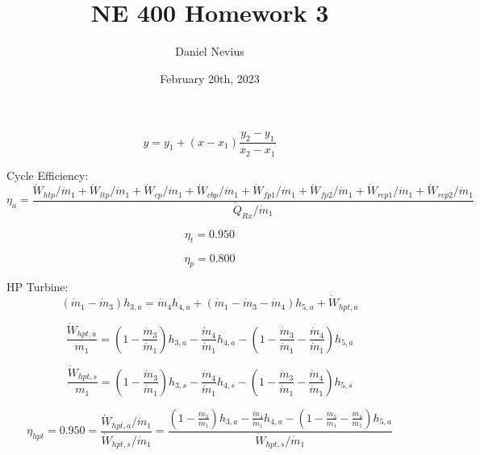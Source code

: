 \documentclass{article}
\title{NE 400 Homework 3}
\author{Daniel Nevius}
\date{February 20th, 2023}
\begin{document}
\maketitle

\section{}

\begin{equation}\label{interpolation}
y = y_1 + (x - x_1) \frac{y_2 - y_1}{x_2 - x_1}
\end{equation}


Cycle Efficiency:
\begin{equation}
\eta_{a} = \frac{\dot{W}_{htp    } / \dot{m}_{1} + \dot{W}_{ltp    } / \dot{m}_{1} + \dot{W}_{cp     } / \dot{m}_{1} + \dot{W}_{cbp    } / \dot{m}_{1} + \dot{W}_{fp1    } / \dot{m}_{1} + \dot{W}_{fp2    } / \dot{m}_{1} + \dot{W}_{rcp1   } / \dot{m}_{1} + \dot{W}_{rcp2   } / \dot{m}_{1}}{\dot{Q}_{Rx     } / \dot{m}_{1}}
\end{equation}

\begin{equation}
\eta_{t} =    0.950
\end{equation}

\begin{equation}
\eta_{p} =    0.800
\end{equation}


HP Turbine:
\begin{equation}
(\dot{m}_{ 1} - \dot{m}_{ 3})h_{ 3,a} = \dot{m}_{ 4}h_{ 4,a} + (\dot{m}_{ 1} - \dot{m}_{ 3} - \dot{m}_{ 4})h_{ 5,a} + \dot{W}_{hpt,a}
\end{equation}

\begin{equation}
\frac{\dot{W}_{hpt,a}}{m_1} = (1 - \frac{\dot{m}_{ 3}}{\dot{m}_{ 1}})h_{ 3,a} - \frac{\dot{m}_{ 4}}{\dot{m}_{ 1}}h_{ 4,a} - (1 - \frac{\dot{m}_{ 3}}{\dot{m}_{ 1}} - \frac{\dot{m}_{ 4}}{\dot{m}_{ 1}})h_{ 5,a}\end{equation}

\begin{equation}\label{hpt_s}
\frac{\dot{W}_{hpt,s}}{m_1} = (1 - \frac{\dot{m}_{ 3}}{\dot{m}_{ 1}})h_{ 3,s} - \frac{\dot{m}_{ 4}}{\dot{m}_{ 1}}h_{ 4,s} - (1 - \frac{\dot{m}_{ 3}}{\dot{m}_{ 1}} - \frac{\dot{m}_{ 4}}{\dot{m}_{ 1}})h_{ 5,s}\end{equation}

\begin{equation}
\eta_{hpt} =    0.950 = \frac{\dot{W}_{hpt,a} / \dot{m}_{1}}{\dot{W}_{hpt,s} / \dot{m}_{1}} = \frac{
(1 - \frac{\dot{m}_{ 3}}{\dot{m}_{ 1}})h_{ 3,a} - \frac{\dot{m}_{ 4}}{\dot{m}_{ 1}}h_{ 4,a} - (1 - \frac{\dot{m}_{ 3}}{\dot{m}_{ 1}} - \frac{\dot{m}_{ 4}}{\dot{m}_{ 1}})h_{ 5,a}}{\dot{W}_{hpt,s} / \dot{m}_{1}}
\end{equation}
\end{document}
